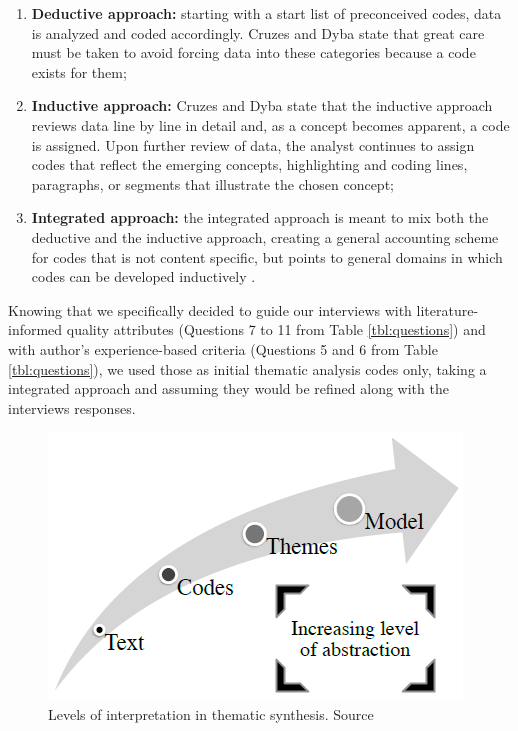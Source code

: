 \begin{enumerate}
    \item \textbf{Deductive approach:} starting with a start list of preconceived codes, data is analyzed and coded accordingly. Cruzes and Dyba \cite{2011_Cruzes_and_Dyba} state that great care must be taken to avoid forcing data into these categories because a code exists for them;
    \item \textbf{Inductive approach:} Cruzes and Dyba \cite{2011_Cruzes_and_Dyba} state that the inductive approach reviews data  line by line in detail and, as a concept becomes apparent, a code is assigned. Upon further review of data, the analyst continues to assign codes that reflect the emerging concepts, highlighting and coding lines, paragraphs, or segments that illustrate the chosen concept;
    \item \textbf{Integrated approach:} the integrated approach is meant to mix both the deductive and the inductive approach, creating a general accounting scheme for codes that is not content specific, but points to general domains in which codes can be developed inductively \cite{2011_Cruzes_and_Dyba}.
\end{enumerate}

Knowing that we specifically decided to guide our interviews with literature-informed quality attributes (Questions 7 to 11 from Table \ref{tbl:questions}) and with author's experience-based criteria \cite{Smart_2014}\cite{Wynne_and_Hellesoy_2012} (Questions 5 and 6 from Table \ref{tbl:questions}), we used those as initial thematic analysis codes only, taking a integrated approach and assuming they would be refined along with the interviews responses.

\begin{figure}[t]
\centering
\includegraphics[width=.6\textwidth]{images/thematic_synthesis_abstractions}
\caption{Levels of interpretation in thematic synthesis. Source \cite{2011_Cruzes_and_Dyba}}
\label{fig:thematic_synthesis_abstractions}
\end{figure}

